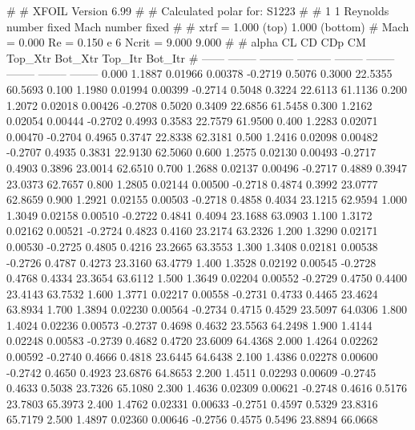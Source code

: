 #  
#       XFOIL         Version 6.99
#  
# Calculated polar for: S1223                                           
#  
# 1 1 Reynolds number fixed          Mach number fixed         
#  
# xtrf =   1.000 (top)        1.000 (bottom)  
# Mach =   0.000     Re =     0.150 e 6     Ncrit =   9.000  9.000
#  
#   alpha    CL        CD       CDp       CM     Top_Xtr  Bot_Xtr  Top_Itr  Bot_Itr
#  ------ -------- --------- --------- -------- -------- -------- -------- --------
   0.000   1.1887   0.01966   0.00378  -0.2719   0.5076   0.3000  22.5355  60.5693
   0.100   1.1980   0.01994   0.00399  -0.2714   0.5048   0.3224  22.6113  61.1136
   0.200   1.2072   0.02018   0.00426  -0.2708   0.5020   0.3409  22.6856  61.5458
   0.300   1.2162   0.02054   0.00444  -0.2702   0.4993   0.3583  22.7579  61.9500
   0.400   1.2283   0.02071   0.00470  -0.2704   0.4965   0.3747  22.8338  62.3181
   0.500   1.2416   0.02098   0.00482  -0.2707   0.4935   0.3831  22.9130  62.5060
   0.600   1.2575   0.02130   0.00493  -0.2717   0.4903   0.3896  23.0014  62.6510
   0.700   1.2688   0.02137   0.00496  -0.2717   0.4889   0.3947  23.0373  62.7657
   0.800   1.2805   0.02144   0.00500  -0.2718   0.4874   0.3992  23.0777  62.8659
   0.900   1.2921   0.02155   0.00503  -0.2718   0.4858   0.4034  23.1215  62.9594
   1.000   1.3049   0.02158   0.00510  -0.2722   0.4841   0.4094  23.1688  63.0903
   1.100   1.3172   0.02162   0.00521  -0.2724   0.4823   0.4160  23.2174  63.2326
   1.200   1.3290   0.02171   0.00530  -0.2725   0.4805   0.4216  23.2665  63.3553
   1.300   1.3408   0.02181   0.00538  -0.2726   0.4787   0.4273  23.3160  63.4779
   1.400   1.3528   0.02192   0.00545  -0.2728   0.4768   0.4334  23.3654  63.6112
   1.500   1.3649   0.02204   0.00552  -0.2729   0.4750   0.4400  23.4143  63.7532
   1.600   1.3771   0.02217   0.00558  -0.2731   0.4733   0.4465  23.4624  63.8934
   1.700   1.3894   0.02230   0.00564  -0.2734   0.4715   0.4529  23.5097  64.0306
   1.800   1.4024   0.02236   0.00573  -0.2737   0.4698   0.4632  23.5563  64.2498
   1.900   1.4144   0.02248   0.00583  -0.2739   0.4682   0.4720  23.6009  64.4368
   2.000   1.4264   0.02262   0.00592  -0.2740   0.4666   0.4818  23.6445  64.6438
   2.100   1.4386   0.02278   0.00600  -0.2742   0.4650   0.4923  23.6876  64.8653
   2.200   1.4511   0.02293   0.00609  -0.2745   0.4633   0.5038  23.7326  65.1080
   2.300   1.4636   0.02309   0.00621  -0.2748   0.4616   0.5176  23.7803  65.3973
   2.400   1.4762   0.02331   0.00633  -0.2751   0.4597   0.5329  23.8316  65.7179
   2.500   1.4897   0.02360   0.00646  -0.2756   0.4575   0.5496  23.8894  66.0668
